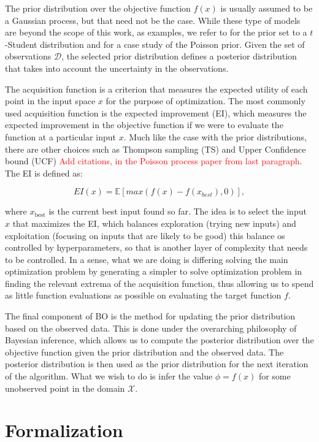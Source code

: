 The prior distribution over the objective function $f(x)$ is usually assumed to be a Gaussian process, but that need not be the case. While these type of models are beyond the scope of this work, as examples, we refer to \cite{shah2013bayesian} for the prior set to a $t$-Student distribution and \cite{wangpoisson} for a case study of the Poisson prior. Given the set of observations $\mathcal{D}$, the selected prior distribution defines a posterior distribution that takes into account the uncertainty in the observations.

The acquisition function is a criterion that measures the expected utility of each point in the input space $x$ for the purpose of optimization. The most commonly used acquisition function is the expected improvement (EI), which measures the expected improvement in the objective function if we were to evaluate the function at a particular input $x$. Much like the case with the prior distributions, there are other choices such as Thompson sampling (TS) and Upper Confidence bound (UCF) \textcolor{red}{Add citations, in the Poisson process paper from last paragraph}. The EI is defined as:

\[ EI(x) = \mathbb{E}[max(f(x) - f(x_{best}), 0)], \]

where $x_{\text{best}}$ is the current best input found so far. The idea is to select the input $x$ that maximizes the EI, which balances exploration (trying new inputs) and exploitation (focusing on inputs that are likely to be good) this balance os controlled by hyperparameters, so that is another layer of complexity that needs to be controlled. In a sense, what we are doing is differing solving the main optimization problem by generating a simpler to solve optimization problem in finding the relevant extrema of the acquisition function, thus allowing us to spend as little function evaluations as possible on evaluating the target function $f$. 

The final component of BO is the method for updating the prior distribution based on the observed data. This is done under the overarching philosophy of Bayesian inference, which allows us to compute the posterior distribution over the objective function given the prior distribution and the observed data. The posterior distribution is then used as the prior distribution for the next iteration of the algorithm. What we wish to do is infer the value $\phi = f(x)$ for some unobserved point in the domain $\mathcal{X}$. 

\section{Formalization}

